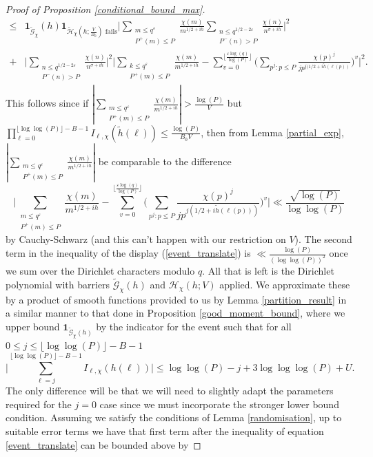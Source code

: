\documentclass[reqno]{amsart}
\theoremstyle{definition}
\theoremstyle{remark}
\numberwithin{equation}{section}
\theoremstyle{remark}
\begin{document}
\begin{proof}[Proof of Proposition \ref{conditional_bound_max}]
\begin{align*}
    \leq& \mathbf{1}_{\widetilde{\mathcal{G}}_\chi}(h)\mathbf{1}_{\widetilde{\mathcal{H}}_\chi(h;\frac{V}{B_0}) \text{ fails}}\big|\sum_{\substack{m \leq q^\varepsilon \\ P^+(m)\leq P}}\frac{\chi(m)}{m^{1/2+ih}}\sum_{\substack{n \leq q^{1/2-2\varepsilon} \\ P^-(n) > P}}\frac{\chi(n)}{n^{\sigma+ih}}\big|^2 \\
    +& \big|\sum_{\substack{n \leq q^{1/2-2\varepsilon} \\ P^{-}(n) > P}}\frac{\chi(n)}{n^{\sigma+ih}}\big|^2\big|\sum_{\substack{k \leq q^{\varepsilon} \\ P^+(m) \leq P}}\frac{\chi(m)}{m^{1/2+ih}}-\sum_{v=0}^{\lfloor\frac{\varepsilon\log(q)}{\log(P)}\rfloor}\big(\sum_{p^j:p \leq P}\frac{\chi(p)^j}{jp^{j(1/2+i\tilde{h}(\ell(p))}}\big)^v\big|^2.
\end{align*}
This follows since if $|\sum_{\substack{m \leq q^\varepsilon \\ P^+(m) \leq P}}\frac{\chi(m)}{m^{1/2+ih}}|>\frac{\log(P)}{V}$ but $\prod_{\ell=0}^{\lfloor\log\log(P)\rfloor-B-1}I_{\ell,\chi}(\tilde{h}(\ell)) \leq \frac{\log(P)}{B_0V}$, then from Lemma \ref{partial_exp}, $|\sum_{\substack{m \leq q^\varepsilon \\ P^+(m) \leq P}}\frac{\chi(m)}{m^{1/2+ih}}|$ be comparable to the difference
$$\big|\sum_{\substack{m \leq q^\varepsilon \\ P^+(m) \leq P}}\frac{\chi(m)}{m^{1/2+ih}}-\sum_{v=0}^{\lfloor\frac{\varepsilon\log(q)}{\log(P)}\rfloor}\big(\sum_{p^j:p \leq P}\frac{\chi(p)^j}{jp^{j(1/2+i\tilde{h}(\ell(p)))}}\big)^v\big| \ll \frac{\sqrt{\log(P)}}{\log\log(P)}$$
by Cauchy-Schwarz (and this can't happen with our restriction on $V$). The second term in the inequality of the display (\ref{event_translate}) is $\ll \frac{\log(P)}{(\log\log(P))^2}$ once we sum over the Dirichlet characters modulo $q$. All that is left is the Dirichlet polynomial with barriers $\widetilde{\mathcal{G}}_\chi(h)$ and $\mathcal{H}_\chi(h;V)$ applied. We approximate these by a product of smooth functions provided to us by Lemma \ref{partition_result} in a similar manner to that done in Proposition \ref{good_moment_bound}, where we upper bound $\mathbf{1}_{\widetilde{\mathcal{G}}_\chi(h)}$ by the indicator for the event such that for all $0 \leq j \leq \lfloor\log\log(P)\rfloor-B-1$
$$\big|\sum_{\ell=j}^{\lfloor\log\log(P)\rfloor-B-1}I_{\ell,\chi}(h(\ell))\big|\leq \log\log(P)-j+3\log\log\log(P)+U.$$
The only difference will be that we will need to slightly adapt the parameters required for the $j=0$ case since we must incorporate the stronger lower bound condition. Assuming we satisfy the conditions of Lemma \ref{randomisation}, up to suitable error terms we have that first term after the inequality of equation \ref{event_translate} can be bounded above by

\end{proof}
\end{document}
